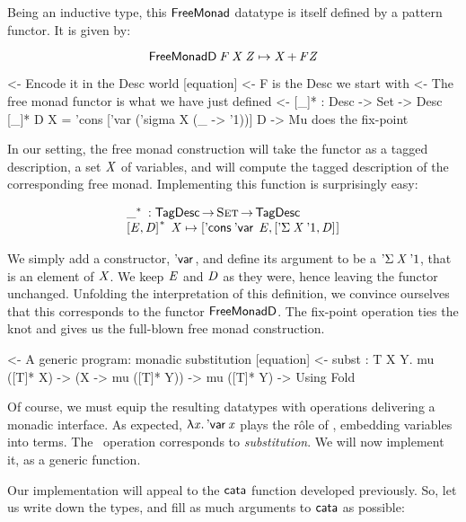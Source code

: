 Being an inductive type, this $\FMFreeMonad$ datatype is itself
defined by a pattern functor. It is given by:

\[
\FMFreeMonadD\: \V{F}\: \V{X}\: \V{Z} \mapsto \V{X} \mathop{\D{+}} \V{F} \V{Z}
\]

\begin{wstructure}
    <- Encode it in the Desc world [equation]
        <- F is the Desc we start with
        <- The free monad functor is what we have just defined
        <- [\_]* : Desc -> Set -> Desc
           [\_]* D X = 'cons ['var ('sigma X (\_ -> '1))] D
        -> Mu does the fix-point
\end{wstructure}

In our setting, the free monad construction will take the functor as a
tagged description, a set $\V{X}$ of variables, and will compute the
tagged description of the corresponding free monad. Implementing this
function is surprisingly easy:

\[\stk{
\FreeMonad{\_} : \TagDesc \To \Set \To \TagDesc \\
\FreeMonad{\pair{\V{E}}{\V{D}}{}}\:\V{X} \mapsto
    \pair{\ListCons{\DVar{}}{\V{E}}}
         {\pair{\DSigma{\V{X}}{\DUnit}}{\V{D}}{}}{}
}\]

We simply add a constructor, $\DVar{\!}$, and define its argument to
be a $\DSigma{\V{X}}{\DUnit}$, that is an element of $\V{X}$. We keep
$\V{E}$ and $\V{D}$ as they were, hence leaving the functor
unchanged. Unfolding the interpretation of this definition, we
convince ourselves that this corresponds to the functor
$\FMFreeMonadD$. The fix-point operation ties the knot and gives us
the full-blown free monad construction.

\begin{wstructure}
<- A generic program: monadic substitution [equation]
    <- subst : \forall T X Y. mu ([T]* X) -> (X -> mu ([T]* Y)) -> mu ([T]* Y)
        -> Using Fold
\end{wstructure}

Of course, we must equip the resulting datatypes with operations
delivering a monadic interface. As expected, \(\LAM{\x}\DVar{\x}\)
plays the r\^ole of \return, embedding variables into terms. The
\bind\ operation corresponds to \emph{substitution}. We will now
implement it, as a generic function.

Our implementation will appeal to the $\cata$ function developed
previously. So, let us write down the types, and fill as much
arguments to $\cata$ as possible:

\newcommand{\subst}{\F{subst}}
\newcommand{\apply}{\F{apply}}

